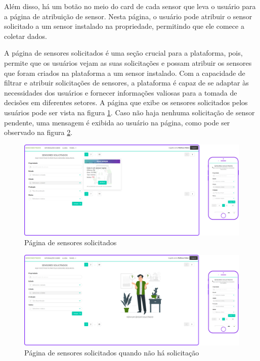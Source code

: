 \documentclass[tcc,capa]{texufpel}
\begin{document}
Além disso, há um botão no meio do card de cada sensor que leva o usuário para a página de atribuição de sensor. Nesta página, o usuário pode atribuir o sensor solicitado a um sensor instalado na propriedade, permitindo que ele comece a coletar dados.

A página de sensores solicitados é uma seção crucial para a plataforma, pois, permite que os usuários vejam as suas solicitações e possam atribuir os sensores que foram criados na plataforma a um sensor instalado. Com a capacidade de filtrar e atribuir solicitações de sensores, a plataforma é capaz de se adaptar às necessidades dos usuários e fornecer informações valiosas para a tomada de decisões em diferentes setores. A página que exibe os sensores solicitados pelos usuários pode ser vista na figura \ref{solicitados}. Caso não haja nenhuma solicitação de sensor pendente, uma mensagem é exibida ao usuário na página, como pode ser observado na figura \ref{solicitadosnull}.

\begin{figure}[htbp]
  \centering \includegraphics[scale=.2]{assets/solicitados.png}
  \caption{Página de sensores solicitados}
  \label{solicitados}
\end{figure}

\begin{figure}[htbp]
  \centering \includegraphics[scale=.2]{assets/solicitadosnull.png}
  \caption{Página de sensores solicitados quando não há solicitação}
  \label{solicitadosnull}
\end{figure}
\newpage
\end{document}

